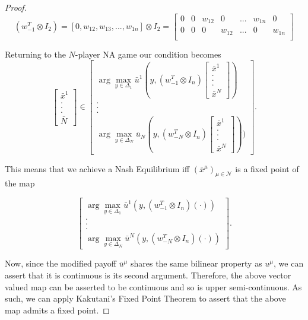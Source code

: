 \documentclass{article}
\theoremstyle{definition}
\newcommand{\agentset}{\mathcal{N}}
\newcommand{\NE}[1]{\bar{x}^{#1}}
\begin{document}
\begin{proof}
		\begin{equation}
			(w_{-1}^T \otimes I_2) = [0, w_{12}, w_{13}, ..., w_{1n}] \otimes I_2 = 
			\begin{bmatrix}
				0 & 0 & w_{12} & 0 & ... & w_{1n} & 0 \\
				0 & 0 & 0 & w_{12} & ... & 0 & w_{1n} \\
			\end{bmatrix}
		\end{equation}
		
		Returning to the $N$-player NA game our condition becomes
		\begin{equation}
			\begin{bmatrix}
				\NE{1} \\ . \\ . \\ . \\ \bar{N}
			\end{bmatrix} \in
			\begin{bmatrix}
				\arg\max_{y \in \Delta_1} \bar{u}^1(y, (w_{-1}^T \otimes I_n) \begin{bmatrix}
					\NE{1} \\ . \\ . \\ . \\ \NE{N}
				\end{bmatrix}) \\ . \\ . \\ . \\ \arg\max_{y \in \Delta_N} \bar{u}_N(y, (w_{-N}^T \otimes I_n) \begin{bmatrix}
				\NE{1} \\ . \\ . \\ . \\ \NE{N}
			\end{bmatrix}))
			\end{bmatrix}	.
		\end{equation}

		This means that we achieve a Nash Equilibrium iff $(\NE{\mu})_{\mu \in \agentset}$ is a fixed point of the map
	
	
		\begin{equation}
			\begin{bmatrix}
				\arg\max_{y \in \Delta_1} \bar{u}^1(y, (w_{-1}^T \otimes I_n) ( \cdot )) \\ . \\ . \\ . \\ \arg\max_{y \in \Delta_N} \bar{u}^N(y, (w_{-N}^T \otimes I_n)( \cdot ))
			\end{bmatrix}	.
		\end{equation}


		Now, since the modified payoff $\bar{u}^\mu$ shares the same bilinear property as $u^\mu$, we can assert that it is continuous is its second argument. Therefore, the above vector valued map can be asserted to be continuous and so is upper semi-continuous. As such, we can apply Kakutani's Fixed Point Theorem to assert that the above map admits a fixed point.

	\end{proof}
\end{document}
